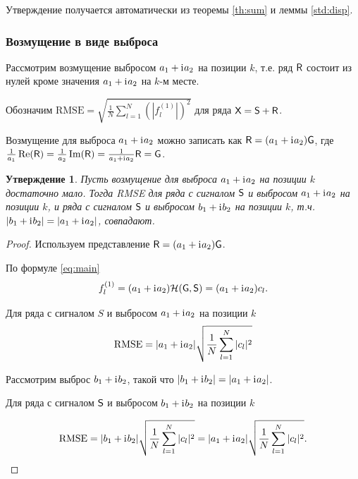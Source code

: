 \documentclass[specialist,
               substylefile = spbu.rtx,
               subf,href,colorlinks=true, 12pt]{disser}
\newtheorem{statement}{Утверждение}
\begin{document}
Утверждение получается автоматически из теоремы \ref{th:sum} и леммы \ref{std:disp}.

\subsubsection{Возмущение в виде выброса} \label{ss:RMSEinv}

Рассмотрим возмущение выбросом $a_1 + \mathrm{i}\mkern1mu a_2$ на позиции $k$, т.е. ряд $\textsf{R}$ состоит из нулей кроме значения $a_1 + \mathrm{i}\mkern1mu a_2$ на $k$-м месте.

Обозначим $\text{RMSE} = \sqrt{\frac{1}{N}\sum_{l = 1}^{N} (|f^{(1)}_l|)^2}$ для ряда $\textsf{X} = \textsf{S} + \textsf{R}$.

Возмущение для выброса $a_1 + \mathrm{i}\mkern1mu a_2$ можно записать как  $\textsf{R} = (a_1 + \mathrm{i}\mkern1mu a_2)\textsf{G}$, где $\frac{1}{a_1}\Re(\textsf{R}) = \frac{1}{a_2}\Im(\textsf{R}) = \frac{1}{a_1 + \mathrm{i}\mkern1mu a_2}\textsf{R} = \textsf{G}$.
\begin{statement}\label{st:RMSEinv}
	Пусть возмущение для выброса $a_1 + \mathrm{i}\mkern1mu a_2$ на позиции $k$ достаточно мало.
	Тогда RMSE для ряда с сигналом $\textsf{S}$ и выбросом $a_1 + \mathrm{i}\mkern1mu a_2$ на позиции $k$, и  ряда с сигналом $\textsf{S}$ и выбросом $b_1 + \mathrm{i}\mkern1mu b_2$ на позиции $k$, т.ч. $|b_1 + \mathrm{i}\mkern1mu b_2| = |a_1 + \mathrm{i}\mkern1mu a_2|$, совпадают.
\end{statement}
\begin{proof}
	Используем представление $\textsf{R} = (a_1 + \mathrm{i}\mkern1mu a_2)\textsf{G}$.
	
	По формуле \eqref{eq:main}
	$$f^{(1)}_l = (a_1 + \mathrm{i}\mkern1mu a_2)\mathcal{H}(\textsf{G}, \textsf{S}) = (a_1 + \mathrm{i}\mkern1mu a_2)c_l.$$
	
	Для ряда с сигналом $S$ и выбросом $a_1 + \mathrm{i}\mkern1mu a_2$ на позиции $k$
	$$\text{RMSE} = |a_1 + \mathrm{i}\mkern1mu a_2|\sqrt{\frac{1}{N}\sum_{l = 1}^{N} |c_l|^2} $$
	
	Рассмотрим выброс $b_1 + \mathrm{i}\mkern1mu b_2$, такой что $|b_1 + \mathrm{i}\mkern1mu b_2| = |a_1 + \mathrm{i}\mkern1mu a_2|$.
	
	Для ряда с сигналом $\textsf{S}$ и выбросом $b_1 + \mathrm{i}\mkern1mu b_2$ на позиции $k$
	
	$$\text{RMSE} = |b_1 + \mathrm{i}\mkern1mu b_2| \sqrt{\frac{1}{N}\sum_{l = 1}^{N} |c_l|^2} = |a_1 + \mathrm{i}\mkern1mu a_2| \sqrt{\frac{1}{N}\sum_{l = 1}^{N} |c_l|^2}.$$
\end{proof}
\end{document}
